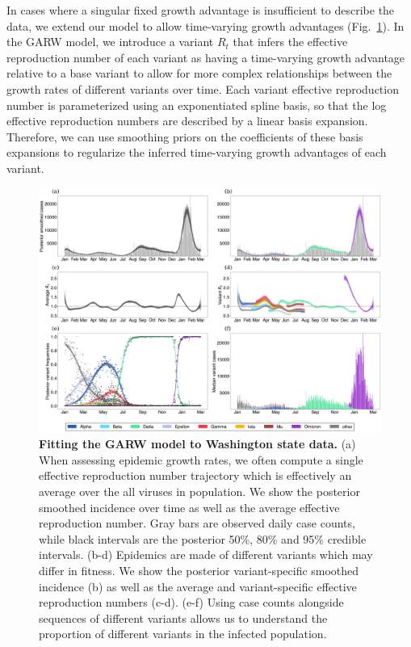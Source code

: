 In cases where a singular fixed growth advantage is insufficient to describe the data, we extend our model to allow time-varying growth advantages (Fig.~\ref{fig:GARW_rt_Washington}).
In the GARW model, we introduce a variant $R_{t}$ that infers the effective reproduction number of each variant as having a time-varying growth advantage relative to a base variant to allow for more complex relationships between the growth rates of different variants over time.
Each variant effective reproduction number is parameterized using an exponentiated spline basis, so that the log effective reproduction numbers are described by a linear basis expansion.
Therefore, we can use smoothing priors on the coefficients of these basis expansions to regularize the inferred time-varying growth advantages of each variant.

\begin{figure}[h!]
  \centering
  \includegraphics[width=\linewidth]{figs/GARW_rt_Washington.png}
  \caption{\textbf{Fitting the GARW model to Washington state data.}
    (a) When assessing epidemic growth rates, we often compute a single effective reproduction number trajectory which is effectively an average over the all viruses in population. We show the posterior smoothed incidence over time as well as the average effective reproduction number.
    Gray bars are observed daily case counts, while black intervals are the posterior 50\%, 80\% and 95\% credible intervals.
    (b-d) Epidemics are made of different variants which may differ in fitness.
    We show the posterior variant-specific smoothed incidence (b) as well as the average and variant-specific effective reproduction numbers (c-d).
    (e-f) Using case counts alongside sequences of different variants allows us to understand the proportion of different variants in the infected population.
    }
  \label{fig:GARW_rt_Washington}
\end{figure}

